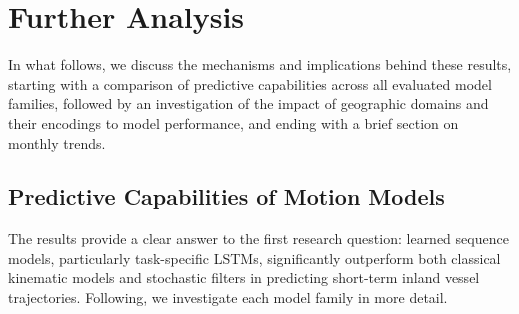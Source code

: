 \section*{Further Analysis}%


In what follows, we discuss the mechanisms and implications behind these results, starting with a comparison of predictive capabilities across all evaluated model families, followed by an investigation of the impact of geographic domains and their encodings to model performance, and ending with a brief section on monthly trends.   

\subsection*{Predictive Capabilities of Motion Models} %



The results provide a clear answer to the first research question: learned sequence models, particularly task-specific \acp{LSTM}, significantly outperform both classical kinematic models and stochastic filters in predicting short-term inland vessel trajectories. Following, we investigate each model family in more detail.

